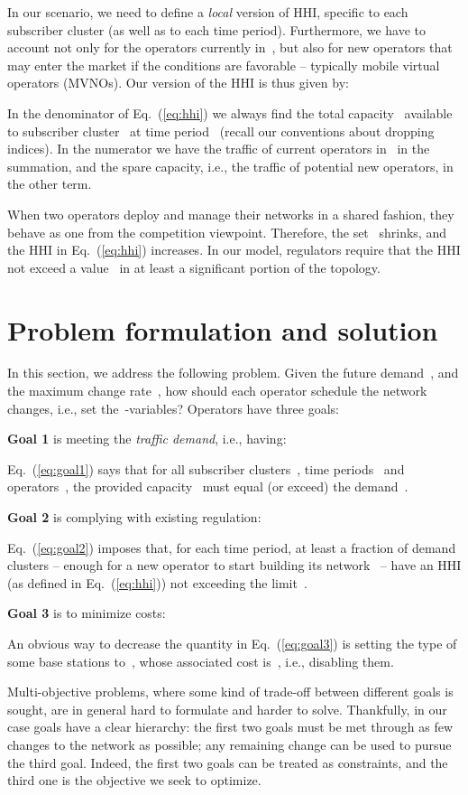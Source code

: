\documentclass[10pt,journal,cspaper,compsoc]{IEEEtran}
\newcommand{\Eq}[1]{Eq.~(\ref{eq:#1})}
\begin{document}
In our scenario, we need to define a {\em local} version of HHI, specific to each
subscriber cluster (as well as to each time period). Furthermore, we have to account not
only for the operators currently in~, but also for new operators that may enter the
market if the conditions are favorable -- typically mobile virtual operators (MVNOs).
Our version of the HHI is thus given by:

In the denominator of \Eq{hhi} we always find the total capacity~
available to subscriber cluster~ at time period~ (recall our conventions
about dropping indices). In the numerator we have the traffic of current operators
in~ in the summation, and the spare capacity, i.e., the traffic of potential
new operators, in the other term.

When two operators deploy and manage their networks in a shared fashion, they
behave as one from the competition viewpoint. Therefore, the set~ shrinks,
and the HHI in \Eq{hhi} increases. In our model, regulators require that the HHI not exceed a value~ in at least a significant portion of the topology.

\section{Problem formulation and solution}
\label{sec:problem}

In this section, we address the following problem. Given the future demand~, and the maximum
change rate~, how should each operator schedule the network
changes, i.e., set the~-variables?
Operators have three goals:

{\bf Goal 1} is meeting the {\em traffic demand}, i.e., having:

\Eq{goal1} says that for all subscriber clusters~, time periods~ and operators~, the
provided capacity~
must equal (or exceed) the demand~.

{\bf Goal 2} is complying with existing regulation:

\Eq{goal2} imposes that, for each time period, at least a fraction  of demand clusters
-- enough for a new operator to start building its network~\cite{vodafone-merger,pakistan} --
have an HHI (as defined in \Eq{hhi}) not exceeding the limit~.

{\bf Goal 3} is to minimize costs:

An obvious way to decrease the quantity in \Eq{goal3} is setting the type of some base stations to~,
whose associated cost is~, i.e., disabling them.

Multi-objective problems,
where some kind of trade-off between different goals is sought, are in general hard to formulate and harder to solve.
Thankfully, in our case goals have a clear hierarchy: the first two goals must be met through as few
changes to the network as possible; any remaining change can be used to pursue the third goal.
Indeed, the first two goals can be treated as constraints, and the third one is the objective we seek to optimize.
\end{document}
